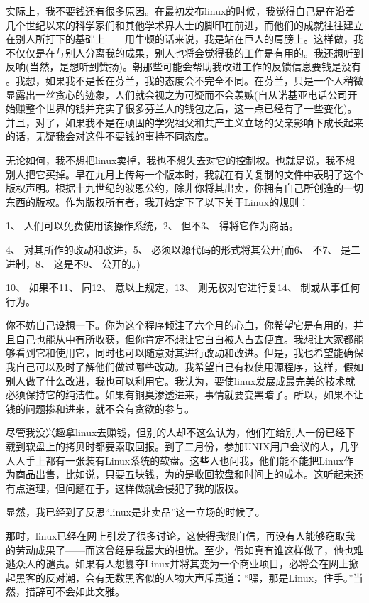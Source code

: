 实际上，我不要钱还有很多原因。在最初发布linux的时候，我觉得自己是在沿着几个世纪以来的科学家们和其他学术界人士的脚印在前进，而他们的成就往往建立在别人所打下的基础上——用牛顿的话来说，我是站在巨人的肩膀上。这样做，我不仅仅是在与别人分离我的成果，别人也将会觉得我的工作是有用的。我还想听到反响(当然，是想听到赞扬)。朝那些可能会帮助我改进工作的反馈信息要钱是没有 。我想，如果我不是长在芬兰，我的态度会不完全不同。在芬兰，只是一个人稍微显露出一丝贪心的迹象，人们就会视之为可疑而不会羡嫉(自从诺基亚电话公司开始赚整个世界的钱并充实了很多芬兰人的钱包之后，这一点已经有了一些变化)。并且，对了，如果我不是在顽固的学究祖父和共产主义立场的父亲影响下成长起来的话，无疑我会对这件不要钱的事持不同态度。

无论如何，我不想把linux卖掉，我也不想失去对它的控制权。也就是说，我不想别人把它买掉。早在九月上传每一个版本时，我就在有关复制的文件中表明了这个版权声明。根据十九世纪的波恩公约，除非你将其出卖，你拥有自己所创造的一切东西的版权。作为版权所有者，我开始定下了以下关于Linux的规则：

1、 人们可以免费使用该操作系统，2、 但不3、 得将它作为商品。

4、 对其所作的改动和改进，5、 必须以源代码的形式将其公开(而6、 不7、 是二进制，8、 这是不9、 公开的。)

10、 如果不11、 同12、 意以上规定，13、 则无权对它进行复14、 制或从事任何行为。

你不妨自己设想一下。你为这个程序倾注了六个月的心血，你希望它是有用的，并且自己也能从中有所收获，但你肯定不想让它白白被人占去便宜。我想让大家都能够看到它和使用它，同时也可以随意对其进行改动和改进。但是，我也希望能确保我自己可以及时了解他们做过哪些改动。我希望自己有权使用源程序，这样，假如别人做了什么改进，我也可以利用它。我认为，要使linux发展成最完美的技术就必须保持它的纯洁性。如果有铜臭渗透进来，事情就要变黑暗了。所以，如果不让钱的问题掺和进来，就不会有贪欲的参与。

尽管我没兴趣拿linux去赚钱，但别的人却不这么认为，他们在给别人一份已经下载到软盘上的拷贝时都要索取回报。到了二月份，参加UNIX用户会议的人，几乎人人手上都有一张装有Linux系统的软盘。这些人也问我，他们能不能把Linux作为商品出售，比如说，只要五块钱，为的是收回软盘和时间上的成本。这听起来还有点道理，但问题在于，这样做就会侵犯了我的版权。

显然，我已经到了反思“linux是非卖品”这一立场的时候了。

那时，linux已经在网上引发了很多讨论，这使得我很自信，再没有人能够窃取我的劳动成果了——而这曾经是我最大的担忧。至少，假如真有谁这样做了，他也难逃众人的谴责。如果有人想篡夺Linux并将其变为一个商业项目，必将会在网上掀起黑客的反对潮，会有无数黑客似的人物大声斥责道：“嘿，那是Linux，住手。”当然，措辞可不会如此文雅。

